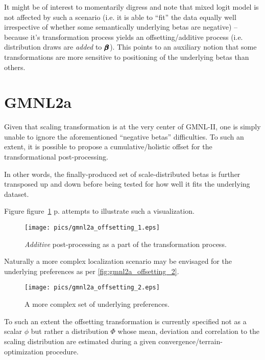 \documentclass[12pt,a4paper]{article}
\begin{document}
It might be of interest to momentarily digress and note that mixed logit model is not affected by such a scenario (i.e. it is able to ``fit'' the data equally well irrespective of whether some semantically underlying betas are negative) -- because it's transformation process yields an offsetting/additive process (i.e. distribution draws are \textit{added} to \(\pmb{\hm{\beta}}\)). This points to an auxiliary notion that some transformations are more sensitive to positioning of the underlying betas than others.


\section{GMNL2a}

Given that scaling transformation is at the very center of GMNL-II, one is simply unable to ignore the aforementioned ``negative betas'' difficulties. To such an extent, it is possible to propose a cumulative/holistic offset for the transformational post-processing. 

In other words, the finally-produced set of scale-distributed betas is further transposed up and down before being tested for how well it fits the underlying dataset. 

Figure figure~\ref{fig:gmnl2a_offsetting_1} p.\pageref{fig:gmnl2a_offsetting_1} attempts to illustrate such a visualization.

\begin{figure}[H]
\begin{framed}
\texttt{[image: pics/gmnl2a\_offsetting\_1.eps]}
\caption{\textit{Additive} post-processing as a part of the transformation process.} 
\label{fig:gmnl2a_offsetting_1}
\end{framed}
\end{figure}

Naturally a more complex localization scenario may be envisaged for the underlying preferences as per \autoref{fig:gmnl2a_offsetting_2}.

\begin{figure}[H]
\begin{framed}
\texttt{[image: pics/gmnl2a\_offsetting\_2.eps]}
\caption{A more complex set of underlying preferences.} 
\label{fig:gmnl2a_offsetting_2}
\end{framed}
\end{figure}

To such an extent the offsetting transformation is currently specified not as a scalar \(\phi\) but rather a distribution \(\Phi\) whose mean, deviation and correlation to the scaling distribution are estimated during a given convergence/terrain-optimization procedure.
\end{document}
